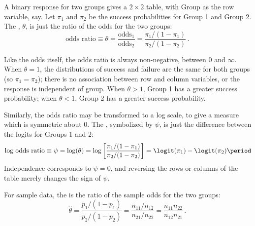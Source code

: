 \documentclass[11pt]{book}\usepackage[]{graphicx}\usepackage[]{color}
\begin{document}
A binary response for two groups gives a $2 \times 2$ table, with
Group as the row variable, say.  Let $\pi_1$ and $\pi_2$ be the
success probabilities for Group 1 and Group 2.  The , $\theta$,
is just the ratio of the odds for the two groups:
\begin{equation*}%
 \mbox{odds ratio} \equiv \theta =
 \frac{\mbox{odds}_1} {\mbox{odds}_2} =
 \frac{\pi_1 / (1-\pi_1)} {\pi_2 / (1-\pi_2)}
 \period
\end{equation*}

Like the odds itself, the odds ratio is always non-negative, between
0 and $\infty$.  When $\theta = 1$, the distributions of success and
failure are the same for both groups (so $\pi_1 = \pi_2$);  there is
no association between row and column variables, or the response
is independent of group.
When $\theta > 1$, Group 1 has a greater success probability;
when $\theta < 1$, Group 2 has a greater success probability.

Similarly, the odds ratio may be transformed to a log scale, to give
a measure which is symmetric about 0.
The , symbolized by $\psi$, is just the difference
between the logits for Groups 1 and 2:
\begin{equation*}%
 \mbox{log odds ratio} \equiv \psi
 = \log (\theta)
 = \log \left[ \frac{\pi_1 / (1-\pi_1)} {\pi_2 / (1-\pi_2)} \right]
 = \logit (\pi_1) - \logit(\pi_2)
 \period
\end{equation*}
Independence corresponds to $\psi =0$, and reversing the rows or columns
of the table merely changes the sign of $\psi$.

For sample data, the  is the ratio of the sample
odds for the two groups:
\begin{equation}\label{eq:soddsratio}
 \hat{\theta} =  \frac{p_1 / (1-p_1)} {p_2 / (1-p_2)} =
 \frac{ n_{11} / n_{12} }{ n_{21} / n_{22}} =
 \frac{ n_{11} n_{22} } {n_{12} n_{21}}
 \period
\end{equation}

\end{document}
